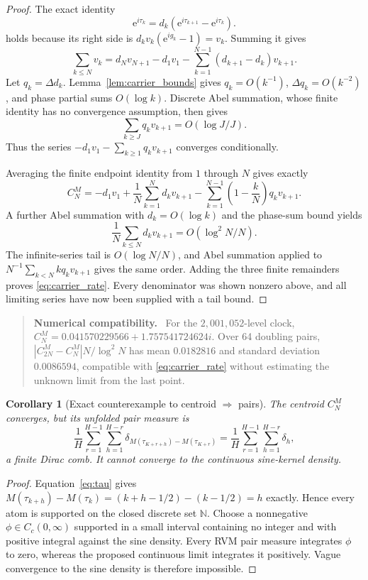 \documentclass[11pt]{amsart}
\newtheorem{corollary}[theorem]{Corollary}
\theoremstyle{definition}
\theoremstyle{remark}
\newcommand{\ee}{\mathrm e}
\newenvironment{numericalcheck}
{\begin{quote}\small\noindent\textbf{Numerical compatibility.}\ }{\end{quote}}
\begin{document}
\begin{proof}
The exact identity
\[
\ee^{i\tau_k}=d_k(\ee^{i\tau_{k+1}}-\ee^{i\tau_k}).
\]
holds because its right side is
$d_kv_k(\ee^{ig_k}-1)=v_k$.  Summing it gives
\[
\sum_{k\le N}v_k=d_Nv_{N+1}-d_1v_1
-\sum_{k=1}^{N-1}(d_{k+1}-d_k)v_{k+1}.
\]
Let $q_k=\Delta d_k$.  Lemma~\ref{lem:carrier_bounds} gives
$q_k=O(k^{-1})$, $\Delta q_k=O(k^{-2})$, and phase partial sums
$O(\log k)$.  Discrete Abel summation, whose finite identity has no convergence
assumption, then gives
\[
\sum_{k\ge J}q_kv_{k+1}=O(\log J/J).
\]
Thus the series
$-d_1v_1-\sum_{k\ge1}q_kv_{k+1}$ converges conditionally.

Averaging the finite endpoint identity from $1$ through $N$ gives exactly
\[
C_N^M=-d_1v_1+\frac1N\sum_{k=1}^Nd_kv_{k+1}
-\sum_{k=1}^{N-1}\left(1-\frac{k}{N}\right)q_kv_{k+1}.
\]
A further Abel summation with $d_k=O(\log k)$ and the phase-sum bound yields
\[
\frac1N\sum_{k\le N}d_kv_{k+1}=O(\log^2N/N).
\]
The infinite-series tail is $O(\log N/N)$, and Abel summation applied to
$N^{-1}\sum_{k<N}kq_kv_{k+1}$ gives the same order.  Adding the three finite
remainders proves \eqref{eq:carrier_rate}.  Every denominator was shown
nonzero above, and all limiting series have now been supplied with a tail
bound.
\end{proof}

\begin{numericalcheck}
For the $2{,}001{,}052$-level clock,
$C_N^M=0.041570229566+1.757541724624i$.  Over 64 doubling pairs,
$|C_{2N}^M-C_N^M|N/\log^2N$ has mean $0.0182816$ and standard deviation
$0.0086594$, compatible with \eqref{eq:carrier_rate} without estimating the
unknown limit from the last point.
\end{numericalcheck}

\begin{corollary}[Exact counterexample to centroid $\Rightarrow$ pairs]
\label{cor:counterexample}
The centroid $C_N^M$ converges, but its unfolded pair measure is
\begin{equation}\label{eq:lattice_pair_measure}
\frac1H\sum_{r=1}^{H-1}\sum_{h=1}^{H-r}
\delta_{M(\tau_{K+r+h})-M(\tau_{K+r})}
=\frac1H\sum_{r=1}^{H-1}\sum_{h=1}^{H-r}\delta_h,
\end{equation}
a finite Dirac comb.  It cannot converge to the continuous sine-kernel density.
\end{corollary}

\begin{proof}
Equation~\eqref{eq:tau} gives
$M(\tau_{k+h})-M(\tau_k)=(k+h-1/2)-(k-1/2)=h$ exactly.  Hence every atom is
supported on the closed discrete set $\mathbb N$.  Choose a nonnegative
$\phi\in C_c(0,\infty)$ supported in a small interval containing no integer
and with positive integral against the sine density.  Every RVM pair measure
integrates $\phi$ to zero, whereas the proposed continuous limit integrates it
positively.  Vague convergence to the sine density is therefore impossible.
\end{proof}
\end{document}

